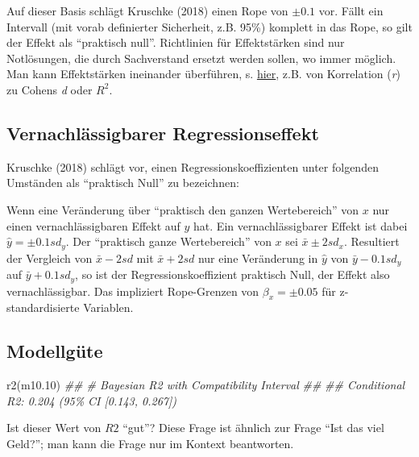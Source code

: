 \documentclass[
  a4paper,
  DIV=11]{scrreprt}
\newenvironment{Shaded}{\begin{snugshade}}{\end{snugshade}}
\newcommand{\DocumentationTok}[1]{\textcolor[rgb]{0.37,0.37,0.37}{\textit{#1}}}
\newcommand{\FloatTok}[1]{\textcolor[rgb]{0.68,0.00,0.00}{#1}}
\newcommand{\FunctionTok}[1]{\textcolor[rgb]{0.28,0.35,0.67}{#1}}
\newcommand{\NormalTok}[1]{\textcolor[rgb]{0.00,0.23,0.31}{#1}}
\theoremstyle{definition}
\theoremstyle{remark}
\begin{document}
Auf dieser Basis schlägt Kruschke (2018) einen Rope von \(\pm0.1\) vor.
Fällt ein Intervall (mit vorab definierter Sicherheit, z.B. 95\%)
komplett in das Rope, so gilt der Effekt als ``praktisch null''.
Richtlinien für Effektstärken sind nur Notlösungen, die durch
Sachverstand ersetzt werden sollen, wo immer möglich. Man kann
Effektstärken ineinander überführen, s.
\href{https://www.escal.site/}{hier}, z.B. von Korrelation (\emph{r}) zu
Cohens \emph{d} oder \(R^2\).

\hypertarget{vernachluxe4ssigbarer-regressionseffekt}{%
\subsection{Vernachlässigbarer
Regressionseffekt}\label{vernachluxe4ssigbarer-regressionseffekt}}

Kruschke (2018) schlägt vor, einen Regressionskoeffizienten unter
folgenden Umständen als ``praktisch Null'' zu bezeichnen:

Wenn eine Veränderung über ``praktisch den ganzen Wertebereich'' von
\(x\) nur einen vernachlässigbaren Effekt auf \(y\) hat. Ein
vernachlässigbarer Effekt ist dabei \(\hat{y}= \pm 0.1 sd_y\). Der
``praktisch ganze Wertebereich'' von \(x\) sei \(\bar{x} \pm 2 sd_x\).
Resultiert der Vergleich von \(\bar{x} -2 sd\) mit \(\bar{x}+2sd\) nur
eine Veränderung in \(\hat{y}\) von \(\bar{y} - 0.1sd_y\) auf
\(\bar{y} + 0.1 sd_y\), so ist der Regressionskoeffizient praktisch
Null, der Effekt also vernachlässigbar. Das impliziert Rope-Grenzen von
\(\beta_x = \pm 0.05\) für z-standardisierte Variablen.

\hypertarget{modellguxfcte}{%
\subsection{Modellgüte}\label{modellguxfcte}}

\begin{Shaded}
\begin{Highlighting}[]
\FunctionTok{r2}\NormalTok{(m10}\FloatTok{.10}\NormalTok{)}
\DocumentationTok{\#\# \# Bayesian R2 with Compatibility Interval}
\DocumentationTok{\#\# }
\DocumentationTok{\#\#   Conditional R2: 0.204 (95\% CI [0.143, 0.267])}
\end{Highlighting}
\end{Shaded}

Ist dieser Wert von \(R2\) ``gut''? Diese Frage ist ähnlich zur Frage
``Ist das viel Geld?''; man kann die Frage nur im Kontext beantworten.
\end{document}
